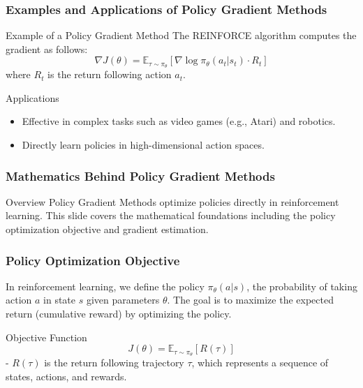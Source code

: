 \documentclass{beamer}
\begin{document}
\begin{frame}[fragile]
    \frametitle{Examples and Applications of Policy Gradient Methods}
    \begin{block}{Example of a Policy Gradient Method}
        The REINFORCE algorithm computes the gradient as follows:
        \begin{equation}
            \nabla J(\theta) = \mathbb{E}_{\tau \sim \pi_{\theta}} \left[ \nabla \log \pi_{\theta}(a_t | s_t) \cdot R_t \right]
        \end{equation}
        where \( R_t \) is the return following action \( a_t \).
    \end{block}

    \begin{block}{Applications}
        \begin{itemize}
            \item Effective in complex tasks such as video games (e.g., Atari) and robotics.
            \item Directly learn policies in high-dimensional action spaces.
        \end{itemize}
    \end{block}
\end{frame}

\begin{frame}[fragile]
    \frametitle{Mathematics Behind Policy Gradient Methods}
    
    \begin{block}{Overview}
        Policy Gradient Methods optimize policies directly in reinforcement learning.
        This slide covers the mathematical foundations including the policy optimization objective and gradient estimation.
    \end{block}
\end{frame}

\begin{frame}[fragile]
    \frametitle{Policy Optimization Objective}
    
    In reinforcement learning, we define the policy \(\pi_{\theta}(a|s)\), the probability of taking action \(a\) in state \(s\) given parameters \(\theta\). The goal is to maximize the expected return (cumulative reward) by optimizing the policy.

    \begin{block}{Objective Function}
        \[
        J(\theta) = \mathbb{E}_{\tau \sim \pi_{\theta}} \left[ R(\tau) \right]
        \]
        - \(R(\tau)\) is the return following trajectory \(\tau\), which represents a sequence of states, actions, and rewards.
    \end{block}
\end{frame}
\end{document}
